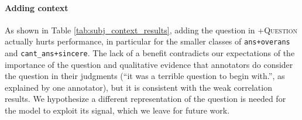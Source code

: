 \begin{table}[]
    \centering
    \caption{Model predictions, with incorrect labels in {\color{red}{red}}. In this example, taking into account the hierarchy eliminates labels for the absent conversation act of `answer'. (Not shown, adding the question does not change these predictions). Adding the sentiment corrects the false positive for the negative intent of lying, predicting the entire label set correctly.}
    \label{tab:pred_models}

\end{table}
\paragraph{Adding context} As shown in Table \ref{tab:subj_context_results}, adding the question in \textsc{+Question} actually hurts performance, in particular for the smaller classes of \texttt{ans+overans} and \texttt{cant\_ans+sincere}. The lack of a benefit contradicts our expectations of the importance of the question and qualitative evidence that annotators do consider the question in their judgments (``it was a terrible question to begin with.'', as explained by one annotator), but it is consistent with the weak correlation results. We hypothesize a different representation of the question is needed for the model to exploit its signal, which we leave for future work.

